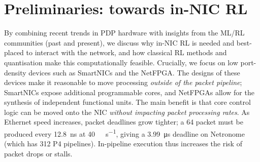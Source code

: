 \documentclass[
sigconf,natbib=false
,anonymous=true
,10pt
]{acmart}
\begin{document}
%

\section{Preliminaries: towards in-NIC RL}\label{sec:motivation}
By combining recent trends in PDP hardware with insights from the ML/RL communities (past and present), we discuss why in-NIC RL is needed and best-placed to interact with the network, and how classical RL methods and quantisation make this computationally feasible.
Crucially, we focus on low port-density devices such as SmartNICs and the NetFPGA.
The designs of these devices make it reasonable to move processing \emph{outside of the packet pipeline}; SmartNICs expose additional programmable cores, and NetFPGAs allow for the synthesis of independent functional units.
The main benefit is that core control logic can be moved onto the NIC \emph{without impacting packet processing rates}.
As Ethernet speed increases, packet deadlines grow tighter; a \SI{64}{\byte} packet must be produced every \SI{12.8}{\nano\second} at \SI{40}{\giga\bit\per\second}, giving a \SI{3.99}{\micro\second} deadline on Netronome (which has \num{312} P4 pipelines).
In-pipeline execution thus increases the risk of packet drops or stalls.

\end{document}

